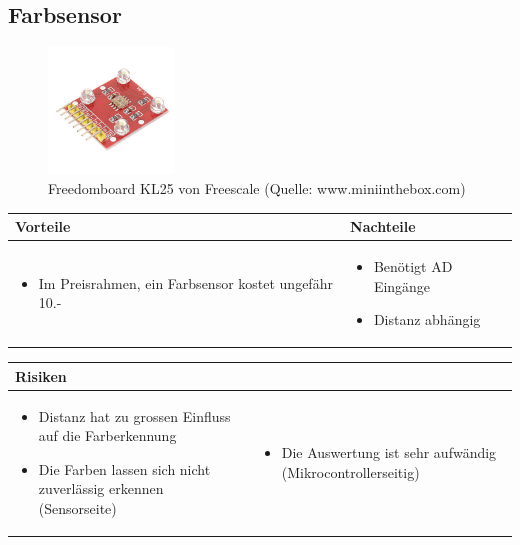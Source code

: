 

\subsection{Farbsensor}
\begin{figure}[h]
	\centering
	\includegraphics[width=0.3\textwidth]{fig/Farbsensor}
	\caption{Freedomboard KL25 von Freescale (Quelle: www.miniinthebox.com)}
\end{figure}


\begin{table}[h]
\begin{tabular}{p{} | p{}}


 \textbf{Vorteile} & \textbf{Nachteile} \\ \hline
	 
\begin{itemize}
\item Im Preisrahmen, ein Farbsensor kostet ungefähr 10.-
\end{itemize}

 &
 
\begin{itemize}
\item Benötigt  AD Eingänge
\item Distanz abhängig
\end{itemize}

\end{tabular}
\end{table}

\begin{table}[h]
\begin{tabular}{p{}p{}}


 \textbf{Risiken} & \\ \hline
	 
\begin{itemize}
\item Distanz hat zu grossen Einfluss auf die Farberkennung
\item Die Farben lassen sich nicht zuverlässig erkennen (Sensorseite)
\end{itemize}
&
\begin{itemize}
\item Die Auswertung ist sehr aufwändig (Mikrocontrollerseitig)
\end{itemize}

 
\end{tabular}
\end{table}

